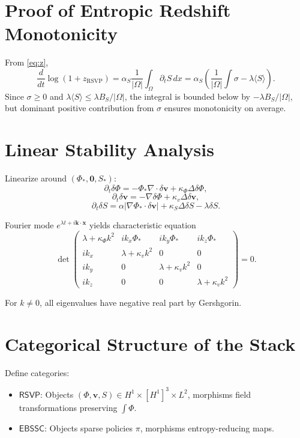 \documentclass[11pt]{article}
\theoremstyle{definition}
\theoremstyle{remark}
\begin{document}
\section{Proof of Entropic Redshift Monotonicity}
\label{app:redshift}

From \eqref{eq:z},
\[
\frac{d}{dt} \log(1 + z_{\mathrm{RSVP}}) = \alpha_S \frac{1}{|\Omega|} \int_\Omega \partial_t S\,dx = \alpha_S \left( \frac{1}{|\Omega|} \int \sigma - \lambda \langle S \rangle \right).
\]
Since $\sigma \ge 0$ and $\lambda \langle S \rangle \le \lambda B_S/|\Omega|$, the integral is bounded below by $-\lambda B_S/|\Omega|$, but dominant positive contribution from $\sigma$ ensures monotonicity on average.

\section{Linear Stability Analysis}
\label{app:stability}

Linearize around $(\Phi_*,\mathbf{0},S_*)$:
\[
\partial_t \delta \Phi = -\Phi_* \nabla \cdot \delta \mathbf{v} + \kappa_\Phi \Delta \delta \Phi,
\]
\[
\partial_t \delta \mathbf{v} = -\nabla \delta \Phi + \kappa_v \Delta \delta \mathbf{v},
\]
\[
\partial_t \delta S = \alpha |\nabla \Phi_* \cdot \delta \mathbf{v}| + \kappa_S \Delta \delta S - \lambda \delta S.
\]

Fourier mode $e^{\lambda t + i\mathbf{k}\cdot\mathbf{x}}$ yields characteristic equation
\[
\det\begin{pmatrix}
\lambda + \kappa_\Phi k^2 & i k_x \Phi_* & i k_y \Phi_* & i k_z \Phi_* \\
i k_x & \lambda + \kappa_v k^2 & 0 & 0 \\
i k_y & 0 & \lambda + \kappa_v k^2 & 0 \\
i k_z & 0 & 0 & \lambda + \kappa_v k^2
\end{pmatrix} = 0.
\]

For $k \ne 0$, all eigenvalues have negative real part by Gershgorin.

\section{Categorical Structure of the Stack}
\label{app:cat}

Define categories:
\begin{itemize}
\item $\mathsf{RSVP}$: Objects $(\Phi,\mathbf{v},S) \in H^1 \times [H^1]^3 \times L^2$, morphisms field transformations preserving $\int \Phi$.
\item $\mathsf{EBSSC}$: Objects sparse policies $\pi$, morphisms entropy-reducing maps.
\end{itemize}
\end{document}
